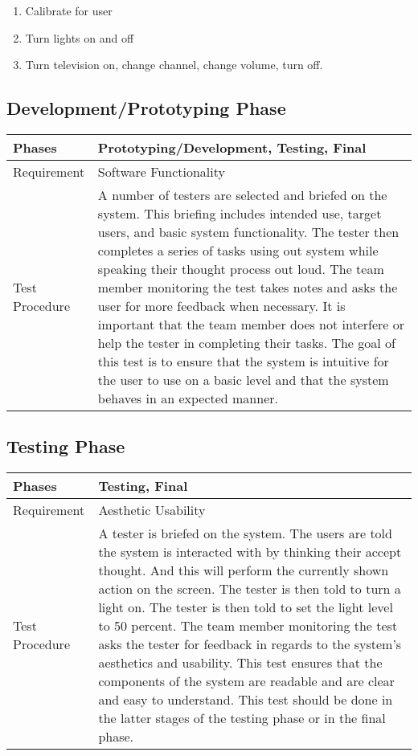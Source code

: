 \documentclass{article}
\begin{document}
\begin{enumerate}
	\item Calibrate for user
	\item Turn lights on and off
	\item Turn television on, change channel, change volume, turn off.
\end{enumerate}

\subsection{Development/Prototyping Phase}
\begin{tabular}{| l | p{12cm}  |}
    \hline
	Phases & Prototyping/Development, Testing, Final \\ \hline
	Requirement & Software Functionality \\ \hline
	Test Procedure & A number of testers are selected and briefed on the
	system. This briefing includes intended use, target users, and basic
	system functionality. The tester then completes a series of tasks using
	out system while speaking their thought process out loud. The team member
	monitoring the test takes notes and asks the user for more feedback when
	necessary. It is important that the team member does not interfere or help
	the tester in completing their tasks. The goal of this test is to ensure
	that the system is intuitive for the user to use on a basic level and that
	the system behaves in an expected manner.
	\\ \hline
\end{tabular}

\subsection{Testing Phase}
\begin{tabular}{| l | p{12cm}  |}
    \hline
	Phases & Testing, Final \\ \hline
	Requirement & Aesthetic Usability \\ \hline
	Test Procedure & A tester is briefed on the system. The users are told the system is interacted with by thinking their accept thought. And this will perform the currently shown action on the screen. The tester
	is then told to turn a light on. The tester is then told to set the light level to 50 percent. The
	team member monitoring the test asks the tester for feedback in regards to
	the system's aesthetics and usability. This test ensures that the components of the
	system are readable and are clear and easy to understand. This test should
	be done in the latter stages of the testing phase or in the final phase.
	\\ \hline
\end{tabular}
\end{document}
